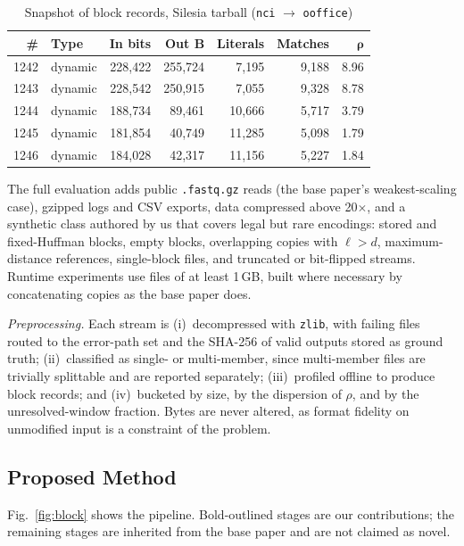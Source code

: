\documentclass[conference]{IEEEtran}
\begin{document}
\begin{table}[t]
\caption{Snapshot of block records, Silesia tarball (\texttt{nci} $\rightarrow$ \texttt{ooffice})}
\label{tab:snapshot}
\centering
\footnotesize
\setlength{\tabcolsep}{3pt}
\begin{tabular}{@{}rlrrrrr@{}}
\toprule
\textbf{\#} & \textbf{Type} & \textbf{In bits} & \textbf{Out B} & \textbf{Literals} & \textbf{Matches} & $\boldsymbol{\rho}$ \\
\midrule
1242 & dynamic & 228{,}422 & 255{,}724 &  7{,}195 & 9{,}188 & 8.96 \\
1243 & dynamic & 228{,}542 & 250{,}915 &  7{,}055 & 9{,}328 & 8.78 \\
1244 & dynamic & 188{,}734 &  89{,}461 & 10{,}666 & 5{,}717 & 3.79 \\
1245 & dynamic & 181{,}854 &  40{,}749 & 11{,}285 & 5{,}098 & 1.79 \\
1246 & dynamic & 184{,}028 &  42{,}317 & 11{,}156 & 5{,}227 & 1.84 \\
\bottomrule
\end{tabular}
\end{table}

The full evaluation adds public \texttt{.fastq.gz} reads (the base paper's
weakest-scaling case), gzipped logs and CSV exports, data compressed above
20$\times$, and a synthetic class authored by us that covers legal but rare
encodings: stored and fixed-Huffman blocks, empty blocks, overlapping copies with
$\ell > d$, maximum-distance references, single-block files, and truncated or
bit-flipped streams. Runtime experiments use files of at least 1\,GB, built where
necessary by concatenating copies as the base paper does.

\emph{Preprocessing.} Each stream is (i)~decompressed with \texttt{zlib}, with
failing files routed to the error-path set and the SHA-256 of valid outputs
stored as ground truth; (ii)~classified as single- or multi-member, since
multi-member files are trivially splittable and are reported separately;
(iii)~profiled offline to produce block records; and (iv)~bucketed by size, by
the dispersion of $\rho$, and by the unresolved-window fraction. Bytes are never
altered, as format fidelity on unmodified input is a constraint of the problem.

\subsection{Proposed Method}

Fig.~\ref{fig:block} shows the pipeline. Bold-outlined stages are our
contributions; the remaining stages are inherited from the base paper and are
not claimed as novel.
\end{document}
